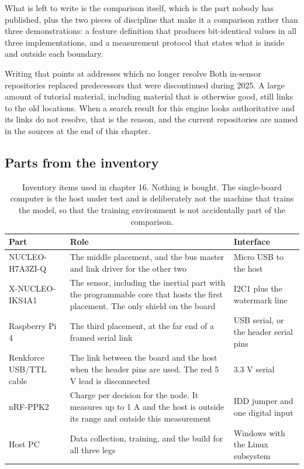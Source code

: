 What is left to write is the comparison itself, which is the part nobody has
published, plus the two pieces of discipline that make it a comparison rather
than three demonstrations: a feature definition that produces bit-identical
values in all three implementations, and a measurement protocol that states what
is inside and outside each boundary.

\begin{note}{Writing that points at addresses which no longer resolve}
Both in-sensor repositories replaced predecessors that were discontinued during
2025. A large amount of tutorial material, including material that is otherwise
good, still links to the old locations. When a search result for this engine
looks authoritative and its links do not resolve, that is the reason, and the
current repositories are named in the sources at the end of this chapter.
\end{note}

\subsection*{Parts from the inventory}

\begin{table}[H]\centering\small
\begin{tabular}{p{40mm}p{66mm}p{40mm}}
\toprule
Part & Role & Interface \\
\midrule
NUCLEO-H7A3ZI-Q & The middle placement, and the bus master and link driver for the other two & Micro USB to the host \\
X-NUCLEO-IKS4A1 & The sensor, including the inertial part with the programmable core that hosts the first placement. The only shield on the board & I2C1 plus the watermark line \\
Raspberry Pi 4 & The third placement, at the far end of a framed serial link & USB serial, or the header serial pins \\
Renkforce USB/TTL cable & The link between the board and the host when the header pins are used. The red 5 V lead is disconnected & 3.3 V serial \\
nRF-PPK2 & Charge per decision for the node. It measures up to 1 A and the host is outside its range and outside this measurement & IDD jumper and one digital input \\
Host PC & Data collection, training, and the build for all three legs & Windows with the Linux subsystem \\
\bottomrule
\end{tabular}
\caption{Inventory items used in chapter 16. Nothing is bought. The single-board computer is the host under test and is deliberately not the machine that trains the model, so that the training environment is not accidentally part of the comparison.}
\end{table}

